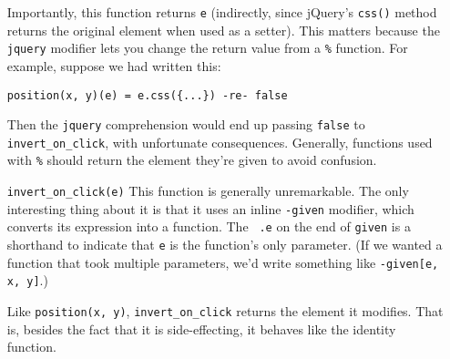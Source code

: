 \documentclass{report}
\begin{document}
\begin{enumerate}
  Importantly, this function returns {\tt e} (indirectly, since jQuery's {\tt css()} method returns the original element when used as a setter). This matters because the {\tt jquery}
  modifier lets you change the return value from a \verb|%| function. For example, suppose we had written this:

\begin{verbatim}
position(x, y)(e) = e.css({...}) -re- false
\end{verbatim}

  Then the {\tt jquery} comprehension would end up passing {\tt false} to \verb|invert_on_click|, with unfortunate consequences. Generally, functions used with \verb|%| should return
  the element they're given to avoid confusion.

\item[{\tt invert\_on\_click(e)}]
  This function is generally unremarkable. The only interesting thing about it is that it uses an inline {\tt -given} modifier, which converts its expression into a function. The {\tt
  .e} on the end of {\tt given} is a shorthand to indicate that {\tt e} is the function's only parameter. (If we wanted a function that took multiple parameters, we'd write something
  like {\tt -given[e, x, y]}.)

  Like {\tt position(x, y)}, \verb|invert_on_click| returns the element it modifies. That is, besides the fact that it is side-effecting, it behaves like the identity function.
\end{enumerate}
\end{document}
